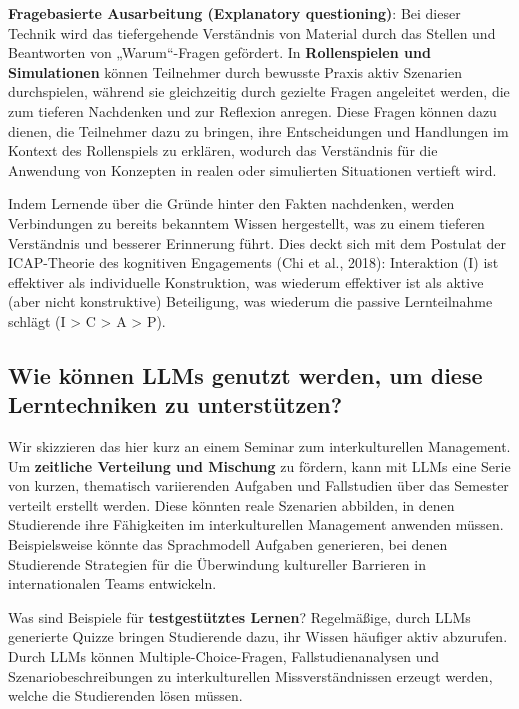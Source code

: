 \documentclass[
  ngerman,
  letterpaper,
  DIV=11]{scrreprt}
\begin{document}
\textbf{Fragebasierte Ausarbeitung (Explanatory questioning)}: Bei
dieser Technik wird das tiefergehende Verständnis von Material durch das
Stellen und Beantworten von „Warum``-Fragen gefördert. In
\textbf{Rollenspielen und Simulationen} können Teilnehmer durch bewusste
Praxis aktiv Szenarien durchspielen, während sie gleichzeitig durch
gezielte Fragen angeleitet werden, die zum tieferen Nachdenken und zur
Reflexion anregen. Diese Fragen können dazu dienen, die Teilnehmer dazu
zu bringen, ihre Entscheidungen und Handlungen im Kontext des
Rollenspiels zu erklären, wodurch das Verständnis für die Anwendung von
Konzepten in realen oder simulierten Situationen vertieft wird.

Indem Lernende über die Gründe hinter den Fakten nachdenken, werden
Verbindungen zu bereits bekanntem Wissen hergestellt, was zu einem
tieferen Verständnis und besserer Erinnerung führt. Dies deckt sich mit
dem Postulat der ICAP-Theorie des kognitiven Engagements (Chi et al.,
2018): Interaktion (I) ist effektiver als individuelle Konstruktion, was
wiederum effektiver ist als aktive (aber nicht konstruktive)
Beteiligung, was wiederum die passive Lernteilnahme schlägt (I
\textgreater{} C \textgreater{} A \textgreater{} P).

\subsection{Wie können LLMs genutzt werden, um diese Lerntechniken zu
unterstützen?}\label{wie-kuxf6nnen-llms-genutzt-werden-um-diese-lerntechniken-zu-unterstuxfctzen}

Wir skizzieren das hier kurz an einem Seminar zum interkulturellen
Management. Um \textbf{zeitliche Verteilung und Mischung} zu fördern,
kann mit LLMs eine Serie von kurzen, thematisch variierenden Aufgaben
und Fallstudien über das Semester verteilt erstellt werden. Diese
könnten reale Szenarien abbilden, in denen Studierende ihre Fähigkeiten
im interkulturellen Management anwenden müssen. Beispielsweise könnte
das Sprachmodell Aufgaben generieren, bei denen Studierende Strategien
für die Überwindung kultureller Barrieren in internationalen Teams
entwickeln.

Was sind Beispiele für \textbf{testgestütztes Lernen}? Regelmäßige,
durch LLMs generierte Quizze bringen Studierende dazu, ihr Wissen
häufiger aktiv abzurufen. Durch LLMs können Multiple-Choice-Fragen,
Fallstudienanalysen und Szenariobeschreibungen zu interkulturellen
Missverständnissen erzeugt werden, welche die Studierenden lösen müssen.
\end{document}
